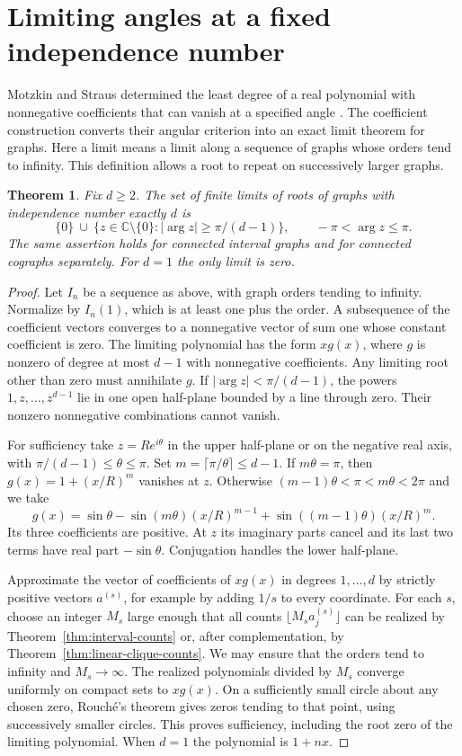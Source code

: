 \documentclass[11pt,a4paper]{article}
\newtheorem{theorem}{Theorem}[section]
\begin{document}
\section{Limiting angles at a fixed independence number}\label{sec:limits}
Motzkin and Straus determined the least degree of a real polynomial with nonnegative coefficients that can vanish at a specified angle \cite[Theorem~2.1]{motzkin}. The coefficient construction converts their angular criterion into an exact limit theorem for graphs. Here a limit means a limit along a sequence of graphs whose orders tend to infinity. This definition allows a root to repeat on successively larger graphs.
\begin{theorem}\label{thm:sector}
Fix $d\ge2$. The set of finite limits of roots of graphs with independence number exactly $d$ is
\[
 \{0\}\ \cup\ \{z\in\mathbb C\setminus\{0\}: |\arg z|\ge\pi/(d-1)\},
 \qquad -\pi<\arg z\le\pi .
\]
The same assertion holds for connected interval graphs and for connected cographs separately. For $d=1$ the only limit is zero.
\end{theorem}
\begin{proof}
Let $I_n$ be a sequence as above, with graph orders tending to infinity. Normalize by $I_n(1)$, which is at least one plus the order. A subsequence of the coefficient vectors converges to a nonnegative vector of sum one whose constant coefficient is zero. The limiting polynomial has the form $xg(x)$, where $g$ is nonzero of degree at most $d-1$ with nonnegative coefficients. Any limiting root other than zero must annihilate $g$. If $|\arg z|<\pi/(d-1)$, the powers $1,z,\ldots,z^{d-1}$ lie in one open half-plane bounded by a line through zero. Their nonzero nonnegative combinations cannot vanish.

For sufficiency take $z=Re^{i\theta}$ in the upper half-plane or on the negative real axis, with $\pi/(d-1)\le\theta\le\pi$. Set $m=\lceil\pi/\theta\rceil\le d-1$. If $m\theta=\pi$, then $g(x)=1+(x/R)^m$ vanishes at $z$. Otherwise $(m-1)\theta<\pi<m\theta<2\pi$ and we take
\[
 g(x)=\sin\theta-\sin(m\theta)(x/R)^{m-1}
                        +\sin((m-1)\theta)(x/R)^m.
\]
Its three coefficients are positive. At $z$ its imaginary parts cancel and its last two terms have real part $-\sin\theta$. Conjugation handles the lower half-plane.

Approximate the vector of coefficients of $xg(x)$ in degrees $1,\ldots,d$ by strictly positive vectors $a^{(s)}$, for example by adding $1/s$ to every coordinate. For each $s$, choose an integer $M_s$ large enough that all counts $\lfloor M_s a^{(s)}_j\rfloor$ can be realized by Theorem~\ref{thm:interval-counts} or, after complementation, by Theorem~\ref{thm:linear-clique-counts}. We may ensure that the orders tend to infinity and $M_s\to\infty$. The realized polynomials divided by $M_s$ converge uniformly on compact sets to $xg(x)$. On a sufficiently small circle about any chosen zero, Rouch\'e's theorem gives zeros tending to that point, using successively smaller circles. This proves sufficiency, including the root zero of the limiting polynomial. When $d=1$ the polynomial is $1+nx$.
\end{proof}
\end{document}
